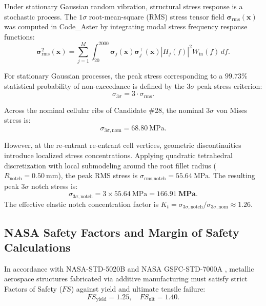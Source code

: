 Under stationary Gaussian random vibration, structural stress response is a stochastic process. The $1\sigma$ root-mean-square (RMS) stress tensor field $\boldsymbol{\sigma}_{\text{rms}}(\mathbf{x})$ was computed in Code\_Aster by integrating modal stress frequency response functions:
\begin{equation}
\boldsymbol{\sigma}_{\text{rms}}^2(\mathbf{x}) = \sum_{j=1}^{M} \int_{20}^{2000} \boldsymbol{\sigma}_j(\mathbf{x}) \boldsymbol{\sigma}_j^\top(\mathbf{x}) |H_j(f)|^2 W_{\text{in}}(f)\, df.
\label{eq:rms_stress_tensor}
\end{equation}

For stationary Gaussian processes, the peak stress corresponding to a $99.73\%$ statistical probability of non-exceedance is defined by the $3\sigma$ peak stress criterion:
\begin{equation}
\sigma_{3\sigma} = 3 \cdot \sigma_{\text{rms}}.
\label{eq:ch6_three_sigma_def}
\end{equation}

Across the nominal cellular ribs of Candidate \#28, the nominal $3\sigma$ von Mises stress is:
\begin{equation}
\sigma_{3\sigma,\text{nom}} = \SI{68.80}{\mega\pascal}.
\end{equation}

However, at the re-entrant re-entrant cell vertices, geometric discontinuities introduce localized stress concentrations. Applying quadratic tetrahedral discretization with local submodeling around the root fillet radius ($R_{\text{notch}} = \SI{0.50}{\milli\meter}$), the peak RMS stress is $\sigma_{\text{rms,notch}} = \SI{55.64}{\mega\pascal}$. The resulting peak $3\sigma$ notch stress is:
\begin{equation}
\sigma_{3\sigma,\text{notch}} = 3 \times \SI{55.64}{\mega\pascal} = \mathbf{166.91\ \si{\mega\pascal}}.
\label{eq:peak_notch_stress}
\end{equation}
The effective elastic notch concentration factor is $K_t = \sigma_{3\sigma,\text{notch}} / \sigma_{3\sigma,\text{nom}} \approx \mathbf{1.26}$.

\subsection{NASA Safety Factors and Margin of Safety Calculations}

In accordance with NASA-STD-5020B \cite{nasa2022} and NASA GSFC-STD-7000A \cite{nasa2013}, metallic aerospace structures fabricated via additive manufacturing must satisfy strict Factors of Safety ($FS$) against yield and ultimate tensile failure:
\begin{equation}
FS_{\text{yield}} = 1.25, \quad FS_{\text{ult}} = 1.40.
\label{eq:factors_of_safety}
\end{equation}

